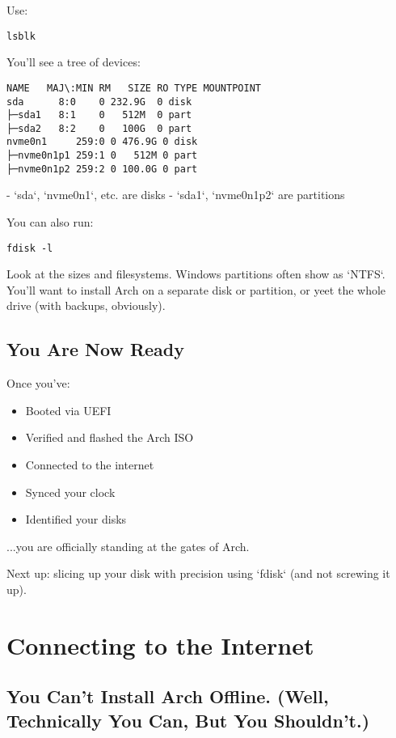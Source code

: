 \documentclass[12pt,openany]{book}
\begin{document}
Use:
\begin{lstlisting}
lsblk
\end{lstlisting}

You'll see a tree of devices:

\begin{lstlisting}
NAME   MAJ\:MIN RM   SIZE RO TYPE MOUNTPOINT
sda      8:0    0 232.9G  0 disk
├─sda1   8:1    0   512M  0 part
├─sda2   8:2    0   100G  0 part
nvme0n1     259:0 0 476.9G 0 disk
├─nvme0n1p1 259:1 0   512M 0 part
├─nvme0n1p2 259:2 0 100.0G 0 part

\end{lstlisting}

- `sda`, `nvme0n1`, etc. are disks
- `sda1`, `nvme0n1p2` are partitions

You can also run:
\begin{lstlisting}
fdisk -l
\end{lstlisting}

Look at the sizes and filesystems. Windows partitions often show as `NTFS`. You’ll want to install Arch on a separate disk or partition, or yeet the whole drive (with backups, obviously).

\section*{You Are Now Ready}

Once you’ve:

\begin{itemize}
  \item Booted via UEFI
  \item Verified and flashed the Arch ISO
  \item Connected to the internet
  \item Synced your clock
  \item Identified your disks
\end{itemize}

...you are officially standing at the gates of Arch.

Next up: slicing up your disk with precision using `fdisk` (and not screwing it up).

\clearpage


\chapter{Connecting to the Internet}

\section*{You Can’t Install Arch Offline. (Well, Technically You Can, But You Shouldn’t.)}
\end{document}
